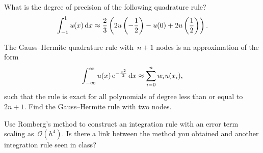 \begin{exercise}
    What is the degree of precision of the following quadrature rule?
    \[
        \int_{-1}^{1} u(x) \, \mathrm d x \approx \frac{2}{3}  \left( 2 u\left(-\frac{1}{2}\right) - u(0) + 2 u\left(\frac{1}{2}\right) \right).
    \]
\end{exercise}

\begin{exercise}
    The Gauss--Hermite quadrature rule with~$n+1$ nodes is an approximation of the form
    \[
        \int_{-\infty}^{\infty} u(x) \, \mathrm e^{- \frac{x^2}{2}} \, \mathrm d x \approx \sum_{i=0}^{n} w_i u(x_i),
    \]
    such that the rule is exact for all polynomials of degree less than or equal to $2n+1$.
    Find the Gauss--Hermite rule with two nodes.
\end{exercise}

\begin{exercise}
    Use Romberg's method to construct an integration rule with an error term scaling as~$\mathcal O(h^4)$.
    Is there a link between the method you obtained and another integration rule seen in class?
\end{exercise}

